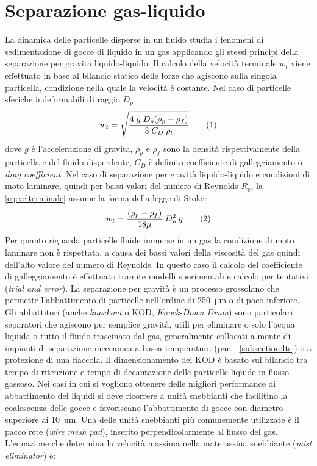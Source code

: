 \section{Separazione gas-liquido}
La dinamica delle particelle disperse in un fluido studia i fenomeni di sedimentazione di gocce di liquido in un gas applicando gli stessi principi della separazione per gravita liquido-liquido. Il calcolo della velocità terminale \(w_t\) viene effettuato in base al bilancio statico delle forze che agiscono sulla singola particella, condizione nella quale la velocità è costante. Nel caso di particelle sferiche indeformabili di raggio \(D_p\)
\[w_t=\sqrt{\dfrac{4 \; g \; D_p(\rho_p-\rho_f)}{3 \; C_D \; \rho_l}} \addtag \label{eq:velterminale}\]
dove \(g\) è l'accelerazione di gravita, \(\rho_p\) e \(\rho_f\) sono la densità rispettivamente della particella e del fluido disperdente, \(C_D\) è definito coefficiente di galleggiamento o \textit{drag coefficient}. Nel caso di separazione per gravità liquido-liquido e condizioni di moto laminare, quindi per bassi valori del numero di Reynolds \(R_e\), la \eqref{eq:velterminale} assume la forma della legge di Stoke:
\[w_t= \dfrac{(\rho_p-\rho_f)}{18\mu} \; D_p^2\; g \addtag \label{eq:stoke}\]
Per quanto riguarda particelle fluide immerse in un gas la condizione di moto laminare non è rispettata, a causa dei bassi valori della viscosità del gas quindi dell'alto valore del numero di Reynolds. In questo caso il calcolo del coefficiente di galleggiamento è effettuato tramite modelli sperimentali e calcolo per tentativi (\textit{trial and error}). La separazione per gravità è un processo grossolano che permette l'abbattimento di particelle nell'ordine di \SI{250}{\um} o di poco inferiore. Gli abbattitori (anche \textit{knockout} o KOD, \textit{Knock-Down Drum}) sono particolari separatori che agiscono per semplice gravità, utili per eliminare o solo l'acqua liquida o tutto il fluido trascinato dal gas, generalmente collocati a monte di impianti di separazione meccanica a bassa temperatura (par. ~\ref{subsection:lts}) o a protezione di una fiaccola. Il dimensionamento dei KOD è basato sul bilancio tra tempo di ritenzione e tempo di decantazione delle particelle liquide in flusso gassoso.
Nei casi in cui si vogliono ottenere delle migliori performance di abbattimento dei liquidi si deve ricorrere a unità snebbianti che facilitino la coalescenza delle gocce e favoriscano l'abbattimento di gocce con diametro superiore ai \SI{10}{um}. Una delle unità snebbianti più comunemente utilizzate è il pacco rete (\textit{wire mesh pad}), inserito perpendicolarmente al flusso del gas. L'equazione che determina la velocità massima nella materassina snebbiante (\textit{mist eliminator}) è:
